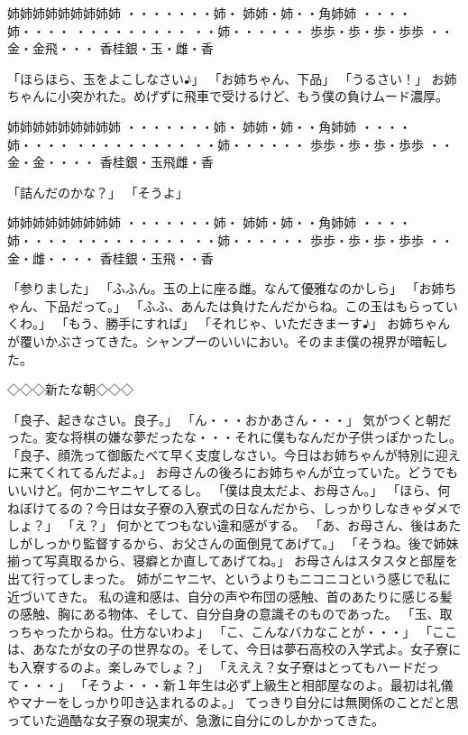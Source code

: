 姉姉姉姉姉姉姉姉姉
・・・・・・・姉・
姉姉・姉・・角姉姉
・・・・姉・・・・
・・・・・・・・・
・・姉・・・・・・
歩歩・歩・歩・歩歩
・・金・金飛・・・
香桂銀・玉・雌・香

「ほらほら、玉をよこしなさい♪」
「お姉ちゃん、下品」
「うるさい！」
お姉ちゃんに小突かれた。めげずに飛車で受けるけど、もう僕の負けムード濃厚。

姉姉姉姉姉姉姉姉姉
・・・・・・・姉・
姉姉・姉・・角姉姉
・・・・姉・・・・
・・・・・・・・・
・・姉・・・・・・
歩歩・歩・歩・歩歩
・・金・金・・・・
香桂銀・玉飛雌・香

「詰んだのかな？」
「そうよ」

姉姉姉姉姉姉姉姉姉
・・・・・・・姉・
姉姉・姉・・角姉姉
・・・・姉・・・・
・・・・・・・・・
・・姉・・・・・・
歩歩・歩・歩・歩歩
・・金・雌・・・・
香桂銀・玉飛・・香

「参りました」
「ふふん。玉の上に座る雌。なんて優雅なのかしら」
「お姉ちゃん、下品だって。」
「ふふ、あんたは負けたんだからね。この玉はもらっていくわ。」
「もう、勝手にすれば」
「それじゃ、いただきまーす♪」
お姉ちゃんが覆いかぶさってきた。シャンプーのいいにおい。そのまま僕の視界が暗転した。



◇◇◇新たな朝◇◇◇

「良子、起きなさい。良子。」
「ん・・・おかあさん・・・」
気がつくと朝だった。変な将棋の嫌な夢だったな・・・それに僕もなんだか子供っぽかったし。
「良子、顔洗って御飯たべて早く支度しなさい。今日はお姉ちゃんが特別に迎えに来てくれてるんだよ。」
お母さんの後ろにお姉ちゃんが立っていた。どうでもいいけど。何かニヤニヤしてるし。
「僕は良太だよ、お母さん。」
「ほら、何ねぼけてるの？今日は女子寮の入寮式の日なんだから、しっかりしなきゃダメでしょ？」
「え？」
何かとてつもない違和感がする。
「あ、お母さん、後はあたしがしっかり監督するから、お父さんの面倒見てあげて。」
「そうね。後で姉妹揃って写真取るから、寝癖とか直してあげてね。」
お母さんはスタスタと部屋を出て行ってしまった。
姉がニヤニヤ、というよりもニコニコという感じで私に近づいてきた。
私の違和感は、自分の声や布団の感触、首のあたりに感じる髪の感触、胸にある物体、そして、自分自身の意識そのものであった。
「玉、取っちゃったからね。仕方ないわよ」
「こ、こんなバカなことが・・・」
「ここは、あなたが女の子の世界なの。そして、今日は夢石高校の入学式よ。女子寮にも入寮するのよ。楽しみでしょ？」
「えええ？女子寮はとってもハードだって・・・」
「そうよ・・・新１年生は必ず上級生と相部屋なのよ。最初は礼儀やマナーをしっかり叩き込まれるのよ。」
てっきり自分には無関係のことだと思っていた過酷な女子寮の現実が、急激に自分にのしかかってきた。







